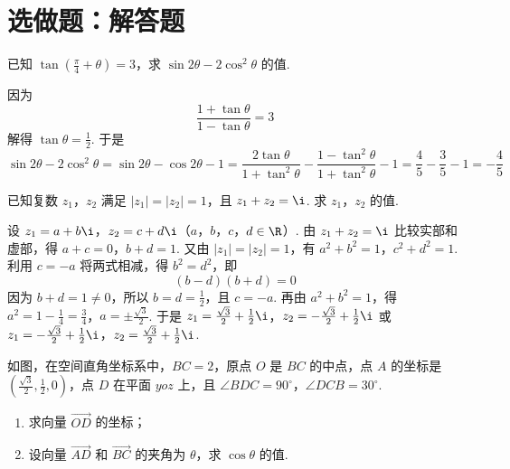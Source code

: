 \documentclass[UTF8,a4paper,oneside,11pt]{ctexbook}
\begin{document}
\section{选做题：解答题}

\begin{problem}[A]
已知 \(\tan\left(\frac{\pi}{4}+\theta\right)=3\)，求 \(\sin2\theta-2\cos^{2}\theta\) 的值.
\end{problem}

\begin{solution}
因为
\[
\frac{1+\tan\theta}{1-\tan\theta}=3
\]
解得 \(\tan\theta=\frac{1}{2}\). 于是
\[
\sin2\theta-2\cos^2\theta
=\sin2\theta-\cos2\theta-1
=\frac{2\tan\theta}{1+\tan^2\theta}-\frac{1-\tan^2\theta}{1+\tan^2\theta}-1
=\frac{4}{5}-\frac{3}{5}-1=-\frac{4}{5}
\]
\end{solution}

\begin{problem}[A]
已知复数 \(z_1\)，\(z_2\) 满足 \(|z_1|=|z_2|=1\)，且 \(z_1+z_2=\i\). 求 \(z_1\)，\(z_2\) 的值.
\end{problem}

\begin{solution}
设 \(z_1=a+b\i\)，\(z_2=c+d\i\)（\(a\)，\(b\)，\(c\)，\(d\in\R\)）. 由
\(z_1+z_2=\i\) 比较实部和虚部，得
\(a+c=0\)，\(b+d=1\).
又由 \(|z_1|=|z_2|=1\)，有
\(a^2+b^2=1\)，\(c^2+d^2=1\).
利用 \(c=-a\) 将两式相减，得 \(b^2=d^2\)，即
\[
(b-d)(b+d)=0
\]
因为 \(b+d=1\ne0\)，所以 \(b=d=\frac{1}{2}\)，且 \(c=-a\). 再由
\(a^2+b^2=1\)，得
\(a^2=1-\frac{1}{4}=\frac{3}{4}\)，\(a=\pm\frac{\sqrt{3}}{2}\).
于是
\(z_1=\frac{\sqrt{3}}{2}+\frac{1}{2}\i\)，\(z_2=-\frac{\sqrt{3}}{2}+\frac{1}{2}\i\)
或
\(z_1=-\frac{\sqrt{3}}{2}+\frac{1}{2}\i\)，\(z_2=\frac{\sqrt{3}}{2}+\frac{1}{2}\i\).
\end{solution}

\setcounter{probnum}{20}
\begin{problem}[B]
如图，在空间直角坐标系中，\(BC=2\)，原点 \(O\) 是 \(BC\) 的中点，点 \(A\) 的坐标是 \(\left(\frac{\sqrt{3}}{2},\frac{1}{2},0\right)\)，点 \(D\) 在平面 \(yoz\) 上，且 \(\angle BDC=90^\circ\)，\(\angle DCB=30^\circ\).

\begin{enumerate}
\item 求向量 \(\overrightarrow{OD}\) 的坐标；
\item 设向量 \(\overrightarrow{AD}\) 和 \(\overrightarrow{BC}\) 的夹角为 \(\theta\)，求 \(\cos\theta\) 的值.
\end{enumerate}

\end{problem}
\end{document}
